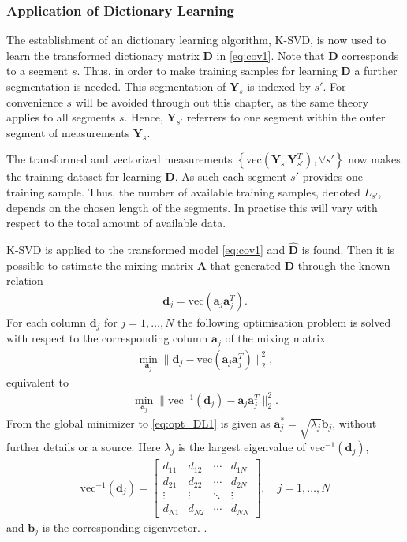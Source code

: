 \subsubsection{Application of Dictionary Learning}
The establishment of an dictionary learning algorithm, K-SVD, is now used to learn the transformed dictionary matrix $\mathbf{D}$ in \eqref{eq:cov1}. 
Note that $\mathbf{D}$ corresponds to a segment $s$. 
Thus, in order to make training samples for learning $\mathbf{D}$ a further segmentation is needed.
This segmentation of $\mathbf{Y}_s$ is indexed by $s'$. 
For convenience $s$ will be avoided through out this chapter, as the same theory applies to all segments $s$.
Hence, $\mathbf{Y}_{s'}$ referrers to one segment within the outer segment of measurements $\mathbf{Y}_s$. 
   
The transformed and vectorized measurements $\left\{ \text{vec} \left( \mathbf{Y}_{s'} \mathbf{Y}_{s'}^T \right), \forall s' \right\}$ now makes the training dataset for learning $\mathbf{D}$. 
As such each segment $s'$ provides one training sample.   
Thus, the number of available training samples, denoted $L_{s'}$, depends on the chosen length of the segments. In practise this will vary with respect to the total amount of available data. 

K-SVD is applied to the transformed model \eqref{eq:cov1} and $\hat{\mathbf{D}}$ is found. Then it is possible to estimate the mixing matrix $\mathbf{A}$ that generated $\mathbf{D}$ through the known relation 
\begin{align*}
\mathbf{d}_j = \text{vec}(\mathbf{a}_j \mathbf{a}_j^T).
\end{align*}
For each column $\mathbf{d}_j$ for $j = 1, \dots, N$ the following optimisation problem is solved with respect to the corresponding column $\mathbf{a}_j$ of the mixing matrix.
\begin{align*}
\min_{\mathbf{a}_j} \| \mathbf{d}_j -\text{vec}\left(\mathbf{a}_j \mathbf{a}_j^T\right) \|_2^2, 
\end{align*}
equivalent to 
\begin{align}
\min_{\mathbf{a}_j} \| \text{vec}^{-1}(\mathbf{d}_j) - \mathbf{a}_j \mathbf{a}_j^T\|_2^2. \label{eq:opt_DL1}
\end{align}
From \cite{Balkan2015} the global minimizer to \eqref{eq:opt_DL1} is given as $\mathbf{a}^{\ast}_j=\sqrt{\lambda_j} \mathbf{b}_j$, without further details or a source.  
Here $\lambda_j$ is the largest eigenvalue of $\text{vec}^{-1}(\mathbf{d}_j)$,
\begin{align*}
\text{vec}^{-1}(\mathbf{d}_j) = 
\begin{bmatrix}
d_{11} & d_{12} & \cdots & d_{1N} \\
d_{21} & d_{22} & \cdots & d_{2N} \\
\vdots & \vdots & \ddots & \vdots \\
d_{N1} & d_{N2} & \cdots & d_{NN}
\end{bmatrix}, \quad j =1, \dots, N
\end{align*}
and $\mathbf{b}_j$ is the corresponding eigenvector.
.


